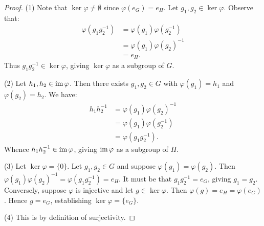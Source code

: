         \begin{proof}
            (1) Note that $\ker \varphi \neq \emptyset$ since $\varphi(e_G) = e_H$. Let $g_1,g_2 \in \ker \varphi$. Observe that:
                \begin{equation*}
                \begin{split}
                    \varphi(g_1 g_2^{-1})
                    & = \varphi(g_1)\varphi(g_2^{-1}) \\
                    & = \varphi(g_1)\varphi(g_2)^{-1} \\
                    & = e_H.
                \end{split}
                \end{equation*}
            Thus $g_1g_2^{-1}\in \ker \varphi$, giving $\ker \varphi$ as a subgroup of $G$.\nl
            
            \noindent (2) Let $h_1,h_2 \in \operatorname{im} \varphi$. Then there exists $g_1,g_2 \in G$ with $\varphi(g_1) = h_1$ and $\varphi(g_2) = h_2$. We have:
                \begin{equation*}
                \begin{split}
                    h_1h_2^{-1}
                    & = \varphi(g_1)\varphi(g_2)^{-1} \\
                    & = \varphi(g_1)\varphi(g_2^{-1}) \\
                    & = \varphi(g_1g_2^{-1}).
                \end{split}
                \end{equation*}
            Whence $h_1h_2^{-1} \in \operatorname{im} \varphi$, giving $\operatorname{im} \varphi$ as a subgroup of $H$. \nl
            
            \noindent (3) Let $\ker \varphi = \{0\}$. Let $g_1,g_2 \in G$ and suppose $\varphi(g_1) = \varphi(g_2)$. Then $\varphi(g_1)\varphi(g_2)^{-1} = \varphi(g_1g_2^{-1}) = e_H$. It must be that $g_1g_2^{-1} = e_G$, giving $g_1 = g_2$. Conversely, suppose $\varphi$ is injective and let $g \in \ker \varphi$. Then $\varphi(g) = e_H = \varphi(e_G)$. Hence $g = e_G$, establishing $\ker \varphi = \{e_G\}$. \nl
            
            \noindent (4) This is by definition of surjectivity.
        \end{proof}

